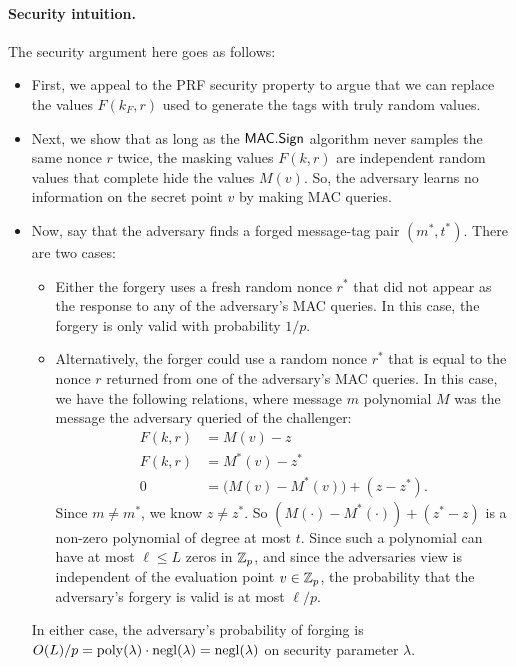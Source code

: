\paragraph{Security intuition.}
The security argument here goes as follows:
\begin{itemize}
  \item First, we appeal to the PRF security property to argue
        that we can replace the values $F(k_F, r)$ used to generate
        the tags with truly random values.

  \item Next, we show that as long as the $\mathsf{MAC.Sign}$ algorithm never
        samples the same nonce $r$ twice, the masking values $F(k,r)$
        are independent random values that complete hide the values $M(v)$.
        So, the adversary learns no information on the secret point $v$
        by making MAC queries.

  \item Now, say that the adversary finds a forged message-tag pair $(m^*, t^*)$.
    There are two cases:
        \begin{itemize}
          \item Either the forgery uses a fresh random nonce $r^*$ that did 
            not appear as the response to any of the adversary's MAC queries.
            In this case, the forgery is only valid with probability $1/p$. 
          \item Alternatively, the forger could use a random nonce $r^*$
            that is equal to the nonce $r$ returned from one of the adversary's
            MAC queries.
            In this case, we have the following relations, where message
            $m$ polynomial $M$ was the message the adversary queried of
            the challenger:
            \begin{align*}
              F(k, r) &= M(v) - z\\
              F(k, r) &= M^*(v) - z^*\\
              0 &= \big(M(v) - M^*(v)\big) + (z - z^*).
            \end{align*}
            Since $m \neq m^*$, we know $z \neq z^*$.
            So $(M(\cdot) - M^*(\cdot)) + (z^* - z)$ is a non-zero polynomial
            of degree at most $t$. 
            Since such a polynomial can have at most $\ell \leq L$ zeros in $\mathbb{Z}_p$,
            and since the adversaries view is independent of the evaluation
            point $v \in \mathbb{Z}_p$, the probability that the adversary's 
            forgery is valid is at most $\ell/p$.
        \end{itemize}

     In either case, the adversary's probability of forging is
     $O(L)/p = \operatorname{poly}(\lambda) \cdot \operatorname{negl}(\lambda) = \operatorname{negl}(\lambda)$
     on security parameter $\lambda$.
\end{itemize}


